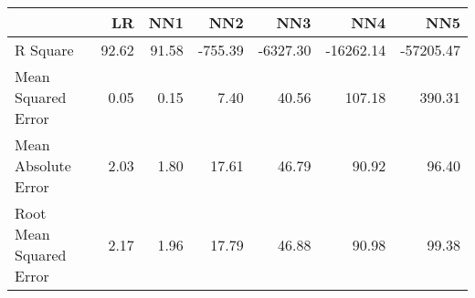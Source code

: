 \begin{tabular}{lrrrrrr}
\toprule
{} &     LR &    NN1 &     NN2 &      NN3 &       NN4 &       NN5 \\
\midrule
R Square                &  92.62 &  91.58 & -755.39 & -6327.30 & -16262.14 & -57205.47 \\
Mean Squared Error      &   0.05 &   0.15 &    7.40 &    40.56 &    107.18 &    390.31 \\
Mean Absolute Error     &   2.03 &   1.80 &   17.61 &    46.79 &     90.92 &     96.40 \\
Root Mean Squared Error &   2.17 &   1.96 &   17.79 &    46.88 &     90.98 &     99.38 \\
\bottomrule
\end{tabular}
